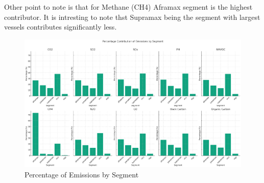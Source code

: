 Other point to note is that for Methane (CH4) Aframax segment is the highest contributor. 
It is intresting to note thst Supramax being the segment with largest vessels contributes significantly less.

\begin{figure}[ht]
    \centering
    \includegraphics[width=1\textwidth]{images/segment_emissions.png}
    \caption{Percentage of Emissions by Segment}
    \label{segment_emissions}
\end{figure}